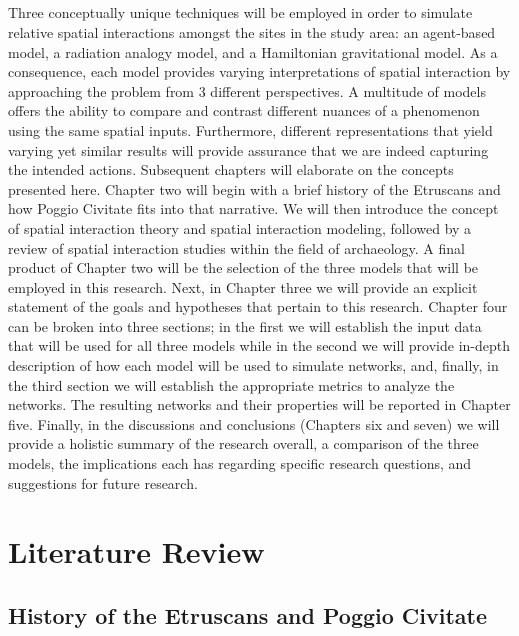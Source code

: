 \documentclass[12pt,a4paper]{thesis}
\begin{document}
\paragraph{}
Three conceptually unique techniques will be employed in order to simulate relative spatial interactions amongst the sites in the study area: an agent-based model, a radiation analogy model, and a Hamiltonian gravitational model. As a consequence, each model provides varying interpretations of spatial interaction by approaching the problem from 3 different perspectives. A multitude of models offers the ability to compare and contrast different nuances of a phenomenon using the same spatial inputs. Furthermore, different representations that yield varying yet similar results will provide assurance that we are indeed capturing the intended actions. Subsequent chapters will elaborate on the concepts presented here. Chapter two will begin with a brief history of the Etruscans  and how Poggio Civitate fits into that narrative. We will then introduce the concept of spatial interaction theory and spatial interaction modeling, followed by a review of spatial interaction studies within the field of archaeology. A final product of Chapter two will be the selection of the three models that will be employed in this research.  Next, in Chapter three we will provide an explicit statement of the goals and hypotheses that pertain to this research. Chapter four can be broken into three sections;  in the first we will establish the input data that will be used for all three models while in the second we will provide in-depth description of how each model will be used to simulate networks, and, finally, in the third section we will establish the appropriate metrics to analyze the networks. The resulting networks and their properties will be reported in Chapter five. Finally, in the discussions and conclusions (Chapters six and seven) we will provide a holistic summary of the research overall, a comparison of the three models, the implications each has regarding specific research questions, and suggestions for future research.

\chapter{Literature Review}
\section{History of the Etruscans and Poggio Civitate}
\end{document}
